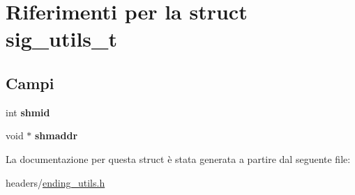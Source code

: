 \hypertarget{structsig__utils__t}{}\section{Riferimenti per la struct sig\+\_\+utils\+\_\+t}
\label{structsig__utils__t}
\subsection*{Campi}
\begin{DoxyCompactItemize}
\item 
\mbox{\label{structsig__utils__t_afbc9ea086ea2fc38ef5c002630e10535}} 
int {\bfseries shmid}
\item 
\mbox{\label{structsig__utils__t_aae4e940427ea675c27428161fbc1ea43}} 
void $\ast$ {\bfseries shmaddr}
\end{DoxyCompactItemize}


La documentazione per questa struct è stata generata a partire dal seguente file\+:\begin{DoxyCompactItemize}
\item 
headers/\hyperlink{ending__utils_8h}{ending\+\_\+utils.\+h}\end{DoxyCompactItemize}
